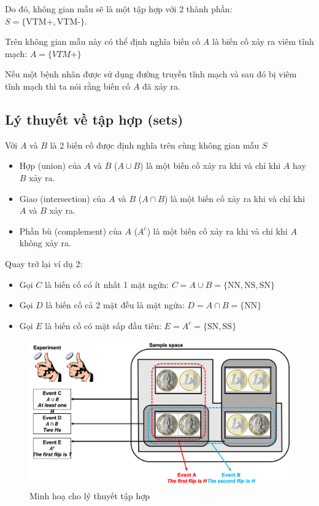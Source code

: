 \documentclass[
]{book}
\providecommand{\tightlist}{%
  \setlength{\itemsep}{0pt}\setlength{\parskip}{0pt}}
\begin{document}
Do đó, không gian mẫu sẽ là một tập hợp với 2 thành phần: \(S = \{\text{VTM+},\text{VTM-}\}\).

Trên không gian mẫu này có thể định nghĩa biến cố \(A\) là biến cố xảy ra viêm tĩnh mạch: \(A = \{VTM+\}\)

Nếu một bệnh nhân được sử dụng đường truyền tĩnh mạch và sau đó bị viêm tĩnh mạch thì ta nói rằng biến cố \(A\) đã xảy ra.

\hypertarget{luxfd-thuyux1ebft-vux1ec1-tux1eadp-hux1ee3p-sets}{%
\subsection{Lý thuyết về tập hợp (sets)}\label{luxfd-thuyux1ebft-vux1ec1-tux1eadp-hux1ee3p-sets}}

Với \(A\) và \(B\) là 2 biến cố được định nghĩa trên cùng không gian mẫu \(S\)

\begin{itemize}
\tightlist
\item
  Hợp (union) của \(A\) và \(B\) (\(A \cup B\)) là một biến cố xảy ra khi và chỉ khi \(A\) hay \(B\) xảy ra.
\item
  Giao (intersection) của \(A\) và \(B\) (\(A \cap B\)) là một biến cố xảy ra khi và chỉ khi \(A\) và \(B\) xảy ra.
\item
  Phần bù (complement) của \(A\) (\(A^c\)) là một biến cố xảy ra khi và chỉ khi \(A\) không xảy ra.
\end{itemize}

Quay trở lại ví dụ 2:

\begin{itemize}
\tightlist
\item
  Gọi \(C\) là biến cố có ít nhất 1 mặt ngửa: \(C = A \cup B = \{\text{NN},\text{NS},\text{SN}\}\)
\item
  Gọi \(D\) là biến cố cả 2 mặt đều là mặt ngửa: \(D = A \cap B = \{\text{NN}\}\)
\item
  Gọi \(E\) là biến cố có mặt sấp đầu tiên: \(E = A^c = \{\text{SN},\text{SS}\}\)
\end{itemize}

\begin{figure}
\includegraphics[width=25.72in]{figures/Picture03} \caption{Minh hoạ cho lý thuyết tập hợp}\label{fig:example3}
\end{figure}
\end{document}
